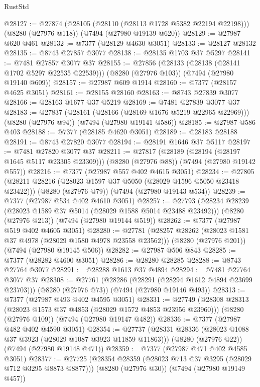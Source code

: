 \begin{lexlean}{RustStd}
\begin{coremodule}
@28127 := @27874
    (@28105 (@28110 (@28113 @1728 @5382 @22194 @22198)))
    (@8280 (@27976 @118))
    (@7494 (@27980 @19139 @620))
@28129 := @27987 @620 @461
@28132 := @7377 (@28129 @4630 @3051)
@28133 := @28127 @28132
@28135 := @8743 @27857 @3077
@28138 := @28135 @1703 @37 @5297
@28141 := @7481 @27857 @3077 @37
@28155 := @27856
    (@28133 (@28138 (@28141 @1702 @5297 @22535 @22539)))
    (@8280 (@27976 @103))
    (@7494 (@27980 @19140 @609))
@28157 := @27987 @609 @1914
@28160 := @7377 (@28157 @4625 @3051)
@28161 := @28155 @28160
@28163 := @8743 @27839 @3077
@28166 := @28163 @1677 @37 @5219
@28169 := @7481 @27839 @3077 @37
@28183 := @27837
    (@28161 (@28166 (@28169 @1676 @5219 @22965 @22969)))
    (@8280 (@27976 @94))
    (@7494 (@27980 @19141 @586))
@28185 := @27987 @586 @403
@28188 := @7377 (@28185 @4620 @3051)
@28189 := @28183 @28188
@28191 := @8743 @27820 @3077
@28194 := @28191 @1646 @37 @5117
@28197 := @7481 @27820 @3077 @37
@28211 := @27817
    (@28189 (@28194 (@28197 @1645 @5117 @23305 @23309)))
    (@8280 (@27976 @88))
    (@7494 (@27980 @19142 @557))
@28216 := @7377 (@27987 @557 @402 @4615 @3051)
@28234 := @27805
    (@28211 @28216 (@28023 @1597 @37 @5050 (@28029 @1596 @5050 @23418 @23422)))
    (@8280 (@27976 @79))
    (@7494 (@27980 @19143 @534))
@28239 := @7377 (@27987 @534 @402 @4610 @3051)
@28257 := @27793
    (@28234 @28239 (@28023 @1589 @37 @5014 (@28029 @1588 @5014 @23488 @23492)))
    (@8280 (@27976 @213))
    (@7494 (@27980 @19144 @519))
@28262 := @7377 (@27987 @519 @402 @4605 @3051)
@28280 := @27781
    (@28257 @28262 (@28023 @1581 @37 @4978 (@28029 @1580 @4978 @23558 @23562)))
    (@8280 (@27976 @201))
    (@7494 (@27980 @19145 @506))
@28282 := @27987 @506 @843
@28285 := @7377 (@28282 @4600 @3051)
@28286 := @28280 @28285
@28288 := @8743 @27764 @3077
@28291 := @28288 @1613 @37 @4894
@28294 := @7481 @27764 @3077 @37
@28308 := @27761
    (@28286 (@28291 (@28294 @1612 @4894 @23699 @23703)))
    (@8280 (@27976 @73))
    (@7494 (@27980 @19146 @493))
@28313 := @7377 (@27987 @493 @402 @4595 @3051)
@28331 := @27749
    (@28308 @28313 (@28023 @1573 @37 @4853 (@28029 @1572 @4853 @23956 @23960)))
    (@8280 (@27976 @109))
    (@7494 (@27980 @19147 @482))
@28336 := @7377 (@27987 @482 @402 @4590 @3051)
@28354 := @27737
    (@28331 @28336 (@28023 @1088 @37 @3923 (@28029 @1087 @3923 @11859 @11863)))
    (@8280 (@27976 @22))
    (@7494 (@27980 @19148 @471))
@28359 := @7377 (@27987 @471 @402 @4585 @3051)
@28377 := @27725
    (@28354 @28359 (@28023 @713 @37 @3295 (@28029 @712 @3295 @8873 @8877)))
    (@8280 (@27976 @30))
    (@7494 (@27980 @19149 @457))

\end{coremodule}
\end{lexlean}
